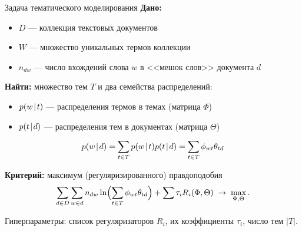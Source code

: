 \begin{frame}[t]{Задача тематического моделирования}
\textbf{Дано:}
\begin{itemize}
    \item $D$ --- коллекция текстовых документов
    \item $W$ --- множество уникальных термов коллекции
    \item $n_{dw}$ --- число вхождений слова $w$ в <<мешок слов>> документа $d$
\end{itemize}

\medskip
\textbf{Найти:}
множество тем $T$ и два семейства распределений:
\smallskip
\begin{itemize}
    \item $p(w \mspace{2mu}{|}\mspace{2mu} t)$ --- распределения термов в темах (матрица $\Phi$)
    \item $p(t \mspace{2mu}{|}\mspace{2mu} d)$ --- распределения тем в документах (матрица $\Theta$)
\end{itemize}

\[
p(w \mspace{2mu}{|}\mspace{2mu} d) = \sum_{t \in T} p(w \mspace{2mu}{|}\mspace{2mu} t)p(t \mspace{2mu}{|}\mspace{2mu} d) = \sum_{t \in T} \phi_{wt}\theta_{td}
\]

\smallskip
\textbf{Критерий:} максимум (регуляризированного) правдоподобия
\[
     \sum_{d\in D} \sum_{w\in d} n_{dw} \ln
        \Bigl(
        \sum_{t\in T}
            \phi_{wt}\theta_{td}
        \Bigr) + \sum \tau_i R_i(\Phi, \Theta)
    \;\to\; \max_{\Phi,\Theta}. 
\]

Гиперпараметры: список регуляризаторов $R_i$, их коэффициенты $\tau_i$, число тем $|T|$.
\end{frame}


